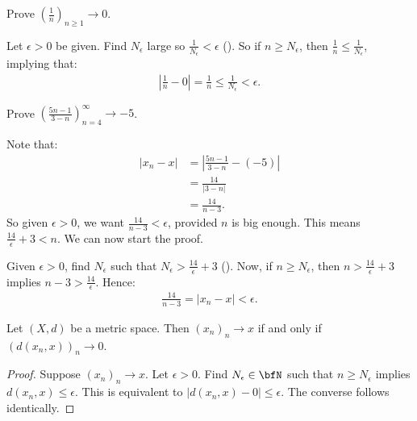     \begin{example}
        Prove $\left(\frac{1}{n}\right)_{n\geq 1} \rightarrow 0$.
    \end{example}
    \begin{solution}
        Let $\epsilon > 0$ be given. Find $N_\epsilon$ large so $\frac{1}{N_\epsilon} < \epsilon$ (). So if $n \geq N_\epsilon$, then $\frac{1}{n} \leq \frac{1}{N_\epsilon}$, implying that:
            \begin{equation*}
            \begin{split}
                \left|\frac{1}{n} - 0\right| = \frac{1}{n} \leq \frac{1}{N_\epsilon} < \epsilon.
            \end{split}
            \end{equation*}
    \end{solution}

    \begin{example}
        Prove $\left(\frac{5n-1}{3-n}\right)_{n = 4}^\infty \rightarrow -5$. 
    \end{example}
    \begin{solution}
        Note that:
            \begin{equation*}
            \begin{split}
                |x_n - x|
                & = \left|\frac{5n-1}{3-n} - (-5)\right| \\
                & = \frac{14}{\left|3-n\right|} \\
                & = \frac{14}{n-3}.
            \end{split}
            \end{equation*}
        So given $\epsilon > 0$, we want $\frac{14}{n-3} < \epsilon$, provided $n$ is big enough. This means $\frac{14}{\epsilon} + 3 < n$. We can now start the proof.

        Given $\epsilon > 0$, find $N_\epsilon$ such that $N_\epsilon > \frac{14}{\epsilon} + 3$ (). Now, if $n \geq N_\epsilon$, then $n > \frac{14}{\epsilon} + 3$ implies $n-3 > \frac{14}{\epsilon}$. Hence:
            \begin{equation*}
            \begin{split}
                \frac{14}{n-3} = \left|x_n - x\right| < \epsilon.
            \end{split}
            \end{equation*}
    \end{solution}
    
    \begin{lemma}
        Let $(X,d)$ be a metric space. Then $(x_n)_n \rightarrow x$ if and only if $(d(x_n,x))_n \rightarrow 0$.
    \end{lemma}
        \begin{proof}
            Suppose $(x_n)_n \rightarrow x$. Let $\epsilon > 0$. Find $N_\epsilon \in \bfN$ such that $n \geq N_\epsilon$ implies $d(x_n , x) \leq \epsilon$. This is equivalent to $|d(x_n, x) - 0 | \leq \epsilon$. The converse follows identically.
        \end{proof}

